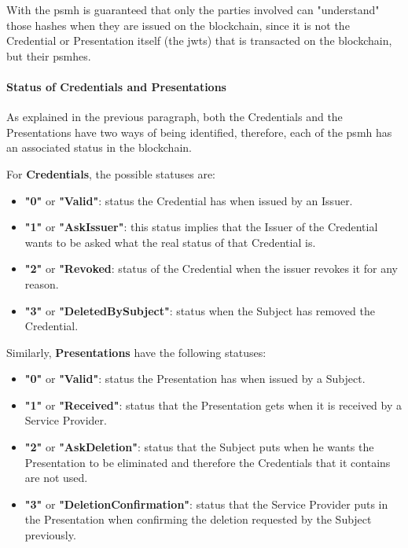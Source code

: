 \documentclass[a4paper, 12pt]{article} %
\begin{document}
                With the \acrshort{psmh} is guaranteed that only the parties involved can "understand" those hashes when they are issued on the blockchain, since it is not the Credential or Presentation itself (the \acrshort{jwt}s) that is transacted on the blockchain, but their \acrshort{psmh}es.
  
            \paragraph{Status of Credentials and Presentations}
                As explained in the previous paragraph, both the Credentials and the Presentations have two ways of being identified, therefore, each of the \acrshort{psmh} has an associated status in the blockchain.
                
                For \textbf{Credentials}, the possible statuses are:
                \begin{itemize}
                    \item \textbf{"0"} or \textbf{"Valid"}: status the Credential has when issued by an Issuer.
                    \item \textbf{"1"} or \textbf{"AskIssuer"}: this status implies that the Issuer of the Credential wants to be asked what the real status of that Credential is.
                    \item \textbf{"2"} or \textbf{"Revoked}: status of the Credential when the issuer revokes it for any reason.
                    \item \textbf{"3"} or \textbf{"DeletedBySubject"}: status when the Subject has removed the Credential.
                \end{itemize}
                
                Similarly, \textbf{Presentations} have the following statuses:
                \begin{itemize}
                  \item \textbf{"0"} or \textbf{"Valid"}: status the Presentation has when issued by a Subject.
                  \item \textbf{"1"} or \textbf{"Received"}: status that the Presentation gets when it is received by a Service Provider.
                  \item \textbf{"2"} or \textbf{"AskDeletion"}: status that the Subject puts when he wants the Presentation to be eliminated and therefore the Credentials that it contains are not used.
                  \item \textbf{"3"} or \textbf{"DeletionConfirmation"}: status that the Service Provider puts in the Presentation when confirming the deletion requested by the Subject previously.
                \end{itemize}
            
\end{document}
